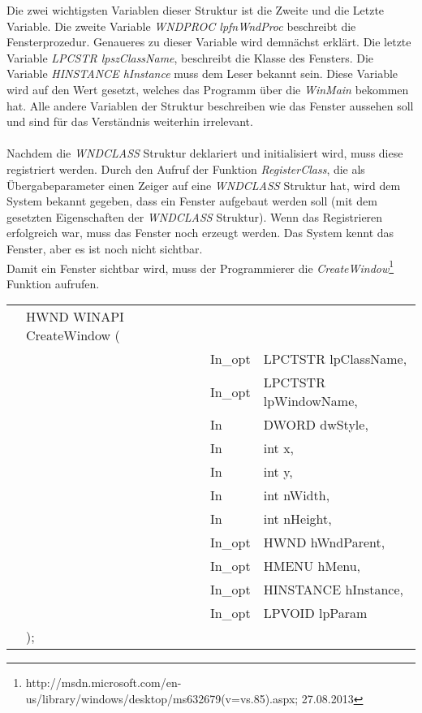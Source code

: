 Die zwei wichtigsten Variablen dieser Struktur ist die Zweite und die Letzte Variable. Die zweite Variable \textit{WNDPROC lpfnWndProc} beschreibt die Fensterprozedur. Genaueres zu dieser Variable wird demnächst erklärt. Die letzte Variable \textit{LPCSTR lpszClassName}, beschreibt die Klasse des Fensters. Die Variable \textit{HINSTANCE hInstance} muss dem Leser bekannt sein. Diese Variable wird auf den Wert gesetzt, welches das Programm über die \textit{WinMain} bekommen hat. Alle andere Variablen der Struktur beschreiben wie das Fenster aussehen soll und sind für das Verständnis weiterhin irrelevant.
\\\\
Nachdem die \textit{WNDCLASS} Struktur deklariert und initialisiert wird, muss diese registriert werden. Durch den Aufruf der Funktion \textit{RegisterClass}, die als Übergabeparameter einen Zeiger auf eine \textit{WNDCLASS} Struktur hat, wird dem System bekannt gegeben, dass ein Fenster aufgebaut werden soll (mit dem gesetzten Eigenschaften der \textit{WNDCLASS} Struktur). Wenn das Registrieren erfolgreich war, muss das Fenster noch erzeugt werden. Das System kennt das Fenster, aber es ist noch nicht sichtbar.\\

Damit ein Fenster sichtbar wird, muss der Programmierer die \textit{CreateWindow}\footnote{http://msdn.microsoft.com/en-us/library/windows/desktop/ms632679(v=vs.85).aspx; 27.08.2013} Funktion aufrufen. 


\begin{tabular}{llll}
&HWND WINAPI CreateWindow (&\\
& & In\_opt & LPCTSTR lpClassName,\\
& & In\_opt & LPCTSTR lpWindowName,\\
& & In      & DWORD dwStyle,\\
& & In      & int x,\\
& & In      & int y,\\
& & In      & int nWidth,\\
& & In      & int nHeight,\\
& & In\_opt & HWND hWndParent,\\
& & In\_opt & HMENU hMenu,\\
& & In\_opt & HINSTANCE hInstance,\\
& & In\_opt & LPVOID lpParam\\
&);
\end{tabular}

